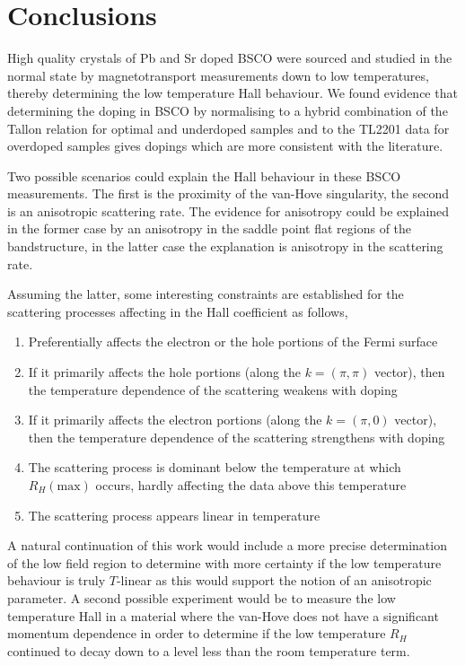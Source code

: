 
\section{Conclusions}

High quality crystals of Pb and Sr doped \ac{BSCO} were sourced and studied in the normal state by magnetotransport measurements down to low temperatures, thereby determining the low temperature Hall behaviour. We found evidence that determining the doping in \ac{BSCO} by normalising to a hybrid combination of the Tallon relation for optimal and underdoped samples and to the \ac{TL2201} data for overdoped samples gives dopings which are more consistent with the literature.

Two possible scenarios could explain the Hall behaviour in these \ac{BSCO} measurements. The first is the proximity of the van-Hove singularity, the second is an anisotropic scattering rate. The evidence for anisotropy could be explained in the former case by an anisotropy in the saddle point flat regions of the bandstructure, in the latter case the explanation is anisotropy in the scattering rate.

Assuming the latter, some interesting constraints are established for the scattering processes affecting in the Hall coefficient as follows,

\begin{enumerate}
    \item Preferentially affects the electron or the hole portions of the Fermi surface
    \item If it primarily affects the hole portions (along the $k=(\pi, \pi)$ vector), then the temperature dependence of the scattering weakens with doping
    \item If it primarily affects the electron portions (along the $k=(\pi, 0)$ vector), then the temperature dependence of the scattering strengthens with doping
    \item The scattering process is dominant below the temperature at which $R_H(\textrm{max})$ occurs, hardly affecting the data above this temperature
    \item The scattering process appears linear in temperature
\end{enumerate}

A natural continuation of this work would include a more precise determination of the low field region to determine with more certainty if the low temperature behaviour is truly $T$-linear as this would support the notion of an anisotropic parameter. A second possible experiment would be to measure the low temperature Hall in a material where the van-Hove does not have a significant momentum dependence in order to determine if the low temperature $R_H$ continued to decay down to a level less than the room temperature term.
